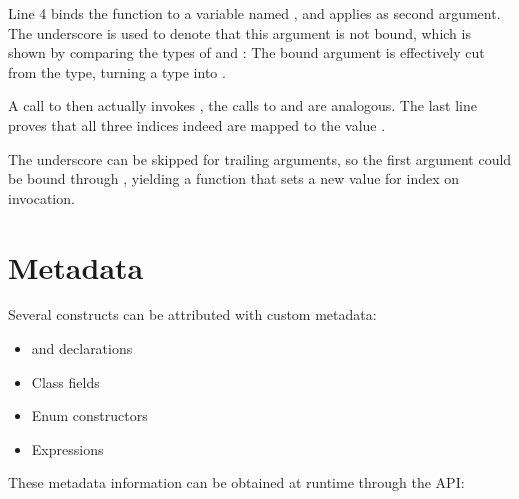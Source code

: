 Line 4 binds the function  to a variable named , and applies  as second argument. The underscore \expr{_} is used to denote that this argument is not bound, which is shown by comparing the types of  and : The bound  argument is effectively cut from the type, turning a  type into .

A call to  then actually invokes , the calls to  and  are analogous. The last line proves that all three indices indeed are mapped to the value .

The underscore \expr{_} can be skipped for trailing arguments, so the first argument could be bound through , yielding a  function that sets a new value for index  on invocation.




\section{Metadata}
\label{lf-metadata}

Several constructs can be attributed with custom metadata:

\begin{itemize}
	\item {} and  declarations
	\item Class fields
	\item Enum constructors
	\item Expressions
\end{itemize}

These metadata information can be obtained at runtime through the  API:

